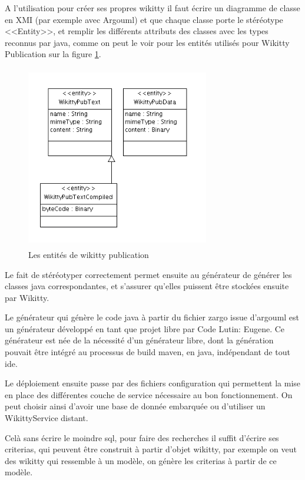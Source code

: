 A l'utilisation pour créer ses propres wikitty il faut écrire un diagramme de
classe en XMI (par exemple avec Argouml) et que chaque classe porte le stéréotype
<<Entity>>, et remplir les différents attributs des classes avec les types
reconnus par java, comme on peut le voir pour les entités utilisés pour Wikitty
Publication sur la figure \ref{umlwikittypub}. 

\begin{figure}[!ht]
\centering
\includegraphics[height=8cm,width=8cm]{image/wikittypubuml.png}
  		\caption{Les entités de wikitty publication}
  		\label{umlwikittypub}
\end{figure}

Le fait de stéréotyper correctement permet ensuite au générateur de générer
les classes java correspondantes, et s'assurer qu'elles puissent être stockées
ensuite par Wikitty.

Le générateur qui génère le code java à partir du fichier zargo issue d'argouml
est un générateur développé en tant que projet libre par Code Lutin: Eugene.
Ce générateur est née de la nécessité d'un générateur libre, dont la génération
pouvait être intégré au processus de build maven, en java, indépendant de tout ide.

Le déploiement ensuite passe par des fichiers configuration qui permettent la
mise en place des différentes couche de service nécessaire au bon fonctionnement.
On peut choisir ainsi d'avoir une base de donnée embarquée ou d'utiliser un
WikittyService distant.

Celà sans écrire le moindre sql, pour faire des recherches il suffit d'écrire
ses criterias, qui peuvent être construit à partir d'objet wikitty, par exemple 
on veut des wikitty qui ressemble à un modèle, on génère les criterias à partir
de ce modèle.

